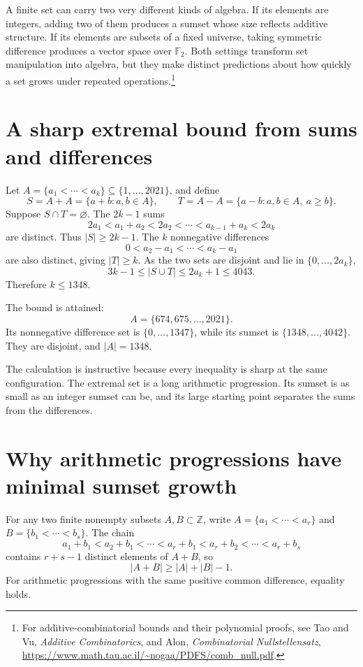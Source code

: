 
A finite set can carry two very different kinds of algebra. If its elements are integers, adding two of them produces a sumset whose size reflects additive structure. If its elements are subsets of a fixed universe, taking symmetric difference produces a vector space over \(\mathbb F_2\). Both settings transform set manipulation into algebra, but they make distinct predictions about how quickly a set grows under repeated operations.\footnote{For additive-combinatorial bounds and their polynomial proofs, see Tao and Vu, \emph{Additive Combinatorics}, and Alon, \emph{Combinatorial Nullstellensatz}, \url{https://www.math.tau.ac.il/~nogaa/PDFS/comb_null.pdf}.}

\section{A sharp extremal bound from sums and differences}

Let \(A=\{a_1<\cdots<a_k\}\subseteq\{1,\ldots,2021\}\), and define
\[
 S=A+A=\{a+b:a,b\in A\},\qquad
 T=A-A=\{a-b:a,b\in A,\ a\ge b\}.
\]
Suppose \(S\cap T=\varnothing\). The \(2k-1\) sums
\[
 2a_1<a_1+a_2<2a_2<\cdots<a_{k-1}+a_k<2a_k
\]
are distinct. Thus \(|S|\ge2k-1\). The \(k\) nonnegative differences
\[
 0<a_2-a_1<\cdots<a_k-a_1
\]
are also distinct, giving \(|T|\ge k\). As the two sets are disjoint and lie in \(\{0,\ldots,2a_k\}\),
\[
 3k-1\le|S\cup T|\le2a_k+1\le4043.
\]
Therefore \(k\le1348\).

The bound is attained:
\[
 A=\{674,675,\ldots,2021\}.
\]
Its nonnegative difference set is \(\{0,\ldots,1347\}\), while its sumset is \(\{1348,\ldots,4042\}\). They are disjoint, and \(|A|=1348\).

The calculation is instructive because every inequality is sharp at the same configuration. The extremal set is a long arithmetic progression. Its sumset is as small as an integer sumset can be, and its large starting point separates the sums from the differences.

\section{Why arithmetic progressions have minimal sumset growth}

For any two finite nonempty subsets \(A,B\subset\mathbb Z\), write \(A=\{a_1<\cdots<a_r\}\) and \(B=\{b_1<\cdots<b_s\}\). The chain
\[
 a_1+b_1<a_2+b_1<\cdots<a_r+b_1
 <a_r+b_2<\cdots<a_r+b_s
\]
contains \(r+s-1\) distinct elements of \(A+B\), so
\[
 \boxed{|A+B|\ge|A|+|B|-1.}
\]
For arithmetic progressions with the same positive common difference, equality holds.

